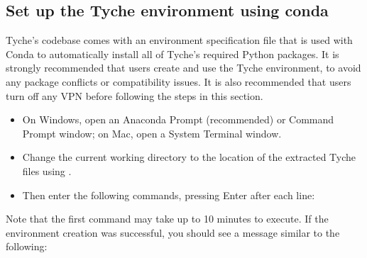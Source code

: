 \documentclass[letterpaper,10pt,english]{sphinxmanual}
\begin{document}
\subsection{Set up the Tyche environment using conda}
\label{\detokenize{cheat-sheet:set-up-the-tyche-environment-using-conda}}
\sphinxAtStartPar
Tyche’s codebase comes with an environment specification file that is used with Conda to automatically install all of Tyche’s required Python packages. It is strongly recommended that users create and use the Tyche environment, to avoid any package conflicts or compatibility issues. It is also recommended that users turn off any VPN before following the steps in this section.
\begin{itemize}
\item {} 
\sphinxAtStartPar
On Windows, open an Anaconda Prompt (recommended) or Command Prompt window; on Mac, open a System Terminal window.

\item {} 
\sphinxAtStartPar
Change the current working directory to the location of the extracted Tyche files using .

\item {} 
\sphinxAtStartPar
Then enter the following commands, pressing Enter after each line:

\end{itemize}

\begin{sphinxVerbatim}[commandchars=\\\{\}]
    \PYGZbs{}
  
\end{sphinxVerbatim}

\sphinxAtStartPar
Note that the first command may take up to 10 minutes to execute. If the environment creation was successful, you should see a message similar to the following:
\end{document}
